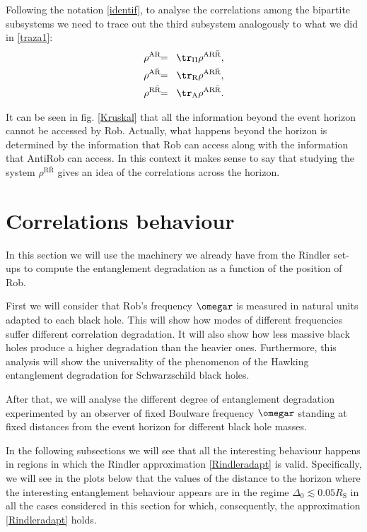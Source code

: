 Following the notation \eqref{identif}, to analyse the correlations among
the bipartite subsystems we need to trace out the third subsystem
analogously to what we did in \eqref{traza1}:
\begin{eqnarray}\label{traza2}
\nonumber\rho^{\text{AR}}&\!\!=\!&\tr_{{\text{II}}}\rho^{\text{AR}\bar{\text{R}}},\\*
\nonumber\rho^{\text{A}\bar{\text{R}}}&\!\!=\!&\tr_{\text{R}}\rho^{\text{AR}\bar{\text{R}}},\\*
\rho^{\text{R}\bar{\text{R}}}&\!\!=\!&\tr_{\text{A}}\rho^{\text{AR}\bar{\text{R}}}.
\end{eqnarray}

It can be seen in fig. \ref{Kruskal} that all the information beyond the
event horizon cannot be accessed by Rob. Actually, what happens beyond
the horizon is determined by the information that Rob can access along
with the information that AntiRob can access. In this context it makes
sense to say that studying the system $\rho^{\text{R}\bar{\text{R}}}$
gives an idea of the correlations across the horizon.



\section{Correlations behaviour}\label{sec4}

In this section we will use the machinery we already have from the Rindler
set-ups to compute the entanglement degradation as a function of the
position of Rob.

First we will consider that Rob's frequency $\omegar$ is measured in
natural units adapted to each black hole. This will show how modes of
different frequencies  suffer different correlation degradation. It will
also show how less massive black holes produce a higher degradation than
the heavier ones. Furthermore, this analysis will show the universality of
the phenomenon of the Hawking entanglement degradation for
Schwarzschild black holes.

After that, we will  analyse the different degree of entanglement
degradation experimented by an observer of fixed Boulware frequency
$\omegar$ standing at fixed distances from the event horizon for
different black hole masses.

In the following subsections we will see that all the interesting behaviour
happens in regions in which the Rindler approximation
\eqref{Rindleradapt} is valid. Specifically, we will see in the plots below that the
values of the distance to the horizon where the interesting
entanglement behaviour appears are in the regime $\Delta_0\lesssim 0.05R_\text{S}$
in all the cases considered in this section for which, consequently, the
approximation \eqref{Rindleradapt} holds.

